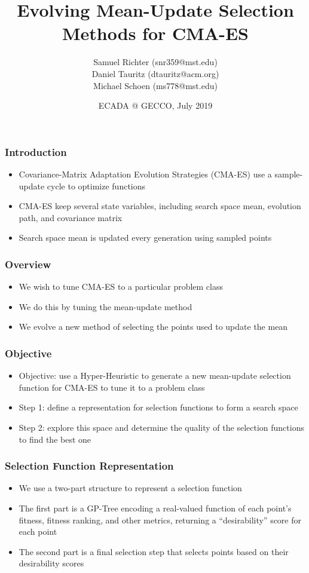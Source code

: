 \documentclass{beamer}
\title[Evolving Mean-Update Selection Methods for CMA-ES]
{Evolving Mean-Update Selection Methods for CMA-ES}
\author[Richter, Samuel et al.] %
{Samuel Richter (snr359@mst.edu) \\Daniel Tauritz (dtauritz@acm.org) \\Michael Schoen (ms778@mst.edu)}
\institute %
{
  Natural Computation Laboratory\\
  Department of Computer Science\\
  Missouri University of Science and Technology\\
  Rolla, Missouri 65409
}
\date{ECADA @ GECCO, July 2019}
\begin{document}
 
	\frame{\titlepage}
	
	\begin{frame}
		\frametitle{Introduction}
		
		\begin{itemize}
			 \item<1-|alert@1> Covariance-Matrix Adaptation Evolution Strategies (CMA-ES) use a sample-update cycle to optimize functions
			 \item<2-|alert@2> CMA-ES keep several state variables, including search space mean, evolution path, and covariance matrix
			 \item<3-|alert@3> Search space mean is updated every generation using sampled points
		\end{itemize}
	\end{frame}

	\begin{frame}
		\frametitle{Overview}

		\begin{itemize}
			\item<1-|alert@1> We wish to tune CMA-ES to a particular problem class
			\item<2-|alert@2> We do this by tuning the mean-update method
			\item<3-|alert@3> We evolve a new method of selecting the points used to update the mean
		\end{itemize}
	\end{frame}
	
	\begin{frame}
		\frametitle{Objective}
		\begin{itemize}
			 \item<1-> Objective: use a Hyper-Heuristic to generate a new mean-update selection function for CMA-ES to tune it to a problem class
			 \item<2-|alert@2> Step 1: define a representation for selection functions to form a search space
			 \item<3-|alert@3> Step 2: explore this space and determine the quality of the selection functions to find the best one
		\end{itemize}	
	\end{frame}	
			
	\begin{frame}
		\frametitle{Selection Function Representation}
		
		\begin{itemize}
			 \item<1-|alert@1> We use a two-part structure to represent a selection function
			 \item<2-|alert@2> The first part is a GP-Tree encoding a real-valued function of each point's fitness, fitness ranking, and other metrics, returning a ``desirability'' score for each point
			 \item<3-|alert@3> The second part is a final selection step that selects points based on their desirability scores
			 
		
		\end{itemize}
	\end{frame}
	
\end{document}
